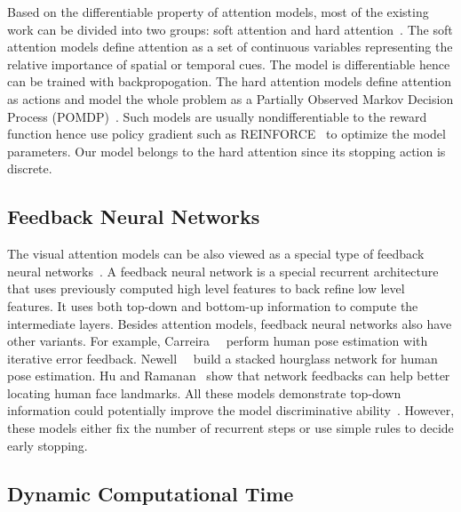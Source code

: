 \documentclass[10pt,twocolumn,letterpaper]{article}
\begin{document}
Based on the differentiable property of attention models, most of the existing work can be divided into two groups: soft attention and hard attention~\cite{xu2015show}.
The soft attention models define attention as a set of continuous variables representing the relative importance of spatial or temporal cues.
The model is differentiable hence can be trained with backpropogation.
The hard attention models define attention as actions and model the whole problem as a Partially Observed Markov Decision Process (POMDP)~\cite{sutton1998reinforcement}.
Such models are usually nondifferentiable to the reward function hence use policy gradient such as REINFORCE~\cite{sutton1999policy} to optimize the model parameters.
Our model belongs to the hard attention since its stopping action is discrete.

\subsection{Feedback Neural Networks}

The visual attention models can be also viewed as a special type of feedback neural networks~\cite{zamir2016feedback, stollenga2014deep, cao2015look, wang2014attentional}.
A feedback neural network is a special recurrent architecture that uses previously computed high level features to back refine low level features.
It uses both top-down and bottom-up information to compute the intermediate layers.
Besides attention models, feedback neural networks also have other variants.
For example, Carreira~\etal~\cite{carreira2016human} perform human pose estimation with iterative error feedback.
Newell~\etal~\cite{newell2016stacked} build a stacked hourglass network for human pose estimation.
Hu and Ramanan~\cite{hu2016bottom} show that network feedbacks can help better locating human face landmarks.
All these models demonstrate top-down information could potentially improve the model discriminative ability~\cite{zamir2016feedback}.
However, these models either fix the number of recurrent steps or use simple rules to decide early stopping.

\subsection{Dynamic Computational Time}
\end{document}
